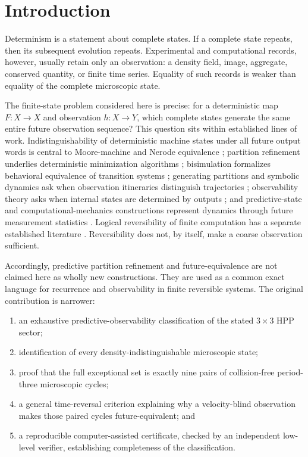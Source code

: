 \documentclass[11pt]{article}
\begin{document}
\section{Introduction}

Determinism is a statement about complete states. If a complete state repeats,
then its subsequent evolution repeats. Experimental and computational records,
however, usually retain only an observation: a density field, image, aggregate,
conserved quantity, or finite time series. Equality of such records is weaker
than equality of the complete microscopic state.

The finite-state problem considered here is precise: for a deterministic map
$F:X\to X$ and observation $h:X\to Y$, which complete states generate the same
entire future observation sequence? This question sits within established lines
of work. Indistinguishability of deterministic machine states under all future
output words is central to Moore-machine and Nerode equivalence
\cite{moore1956,nerode1958}; partition refinement underlies deterministic
minimization algorithms \cite{paige1987}; bisimulation formalizes behavioral
equivalence of transition systems \cite{park1981}; generating partitions and
symbolic dynamics ask when observation itineraries distinguish trajectories
\cite{sinai1968}; observability theory asks when internal states are determined by
outputs \cite{kalman1960}; and predictive-state and computational-mechanics
constructions represent dynamics through future measurement statistics
\cite{crutchfield1989,littman2002}. Logical reversibility of finite computation
has a separate established literature \cite{bennett1973}. Reversibility does not,
by itself, make a coarse observation sufficient.

Accordingly, predictive partition refinement and future-equivalence are not
claimed here as wholly new constructions. They are used as a common exact
language for recurrence and observability in finite reversible systems. The
original contribution is narrower:
\begin{enumerate}[leftmargin=1.55em]
  \item an exhaustive predictive-observability classification of the stated
  $3\times3$ HPP sector;
  \item identification of every density-indistinguishable microscopic state;
  \item proof that the full exceptional set is exactly nine pairs of
  collision-free period-three microscopic cycles;
  \item a general time-reversal criterion explaining why a velocity-blind
  observation makes those paired cycles future-equivalent; and
  \item a reproducible computer-assisted certificate, checked by an independent
  low-level verifier, establishing completeness of the classification.
\end{enumerate}
\end{document}
